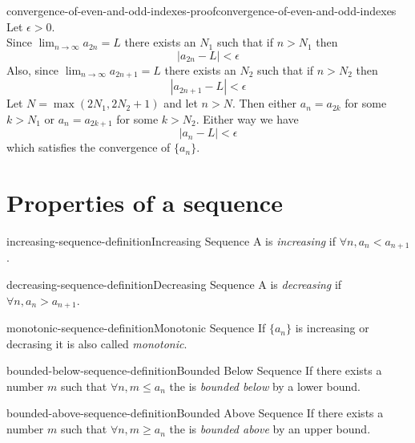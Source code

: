 \documentclass[preview]{standalone}
\begin{document}
\begin{snippetproof}{convergence-of-even-and-odd-indexes-proof}{convergence-of-even-and-odd-indexes}{}
    Let \(\epsilon>0\). \\
    Since \(\lim_{n\to\infty}a_{2n}=L\) there exists an \(N_1\) such that
    if \(n>N_1\) then
    \[
        |a_{2n}-L|<\epsilon
    \]
    Also, since \(\lim_{n\to\infty}a_{2n+1}=L\) there exists an \(N_2\) such that
    if \(n>N_2\) then
    \[
        |a_{2n+1}-L|<\epsilon
    \]
    Let \(N=\max(2N_1, 2N_2+1)\) and let \(n>N\).
    Then either \(a_n=a_{2k}\) for some \(k>N_1\) or \(a_n=a_{2k+1}\)
    for some \(k>N_2\). Either way we have
    \[
        |a_n-L|<\epsilon
    \]
    which satisfies the convergence of \(\{a_n\}\).
\end{snippetproof}

\section{Properties of a sequence}

\begin{snippetdefinition}{increasing-sequence-definition}{Increasing Sequence}
    A \sequence is \textit{increasing} if \(\forall n, a_n<a_{n+1}\).
\end{snippetdefinition}

\begin{snippetdefinition}{decreasing-sequence-definition}{Decreasing Sequence}
    A \sequence is \textit{decreasing} if \(\forall n, a_n>a_{n+1}\).
\end{snippetdefinition}

\begin{snippetdefinition}{monotonic-sequence-definition}{Monotonic Sequence}
    If \(\{a_n\}\) is increasing or decrasing it is also called \textit{monotonic}.
\end{snippetdefinition}

\begin{snippetdefinition}{bounded-below-sequence-definition}{Bounded Below Sequence}
    If there exists a number \(m\) such that \(\forall n, m \leq a_n\)
    the \sequence is \textit{bounded below} by a lower bound.
\end{snippetdefinition}

\begin{snippetdefinition}{bounded-above-sequence-definition}{Bounded Above Sequence}
    If there exists a number \(m\) such that \(\forall n, m \geq a_n\)
    the \sequence is \textit{bounded above} by an upper bound.
\end{snippetdefinition}
\end{document}
